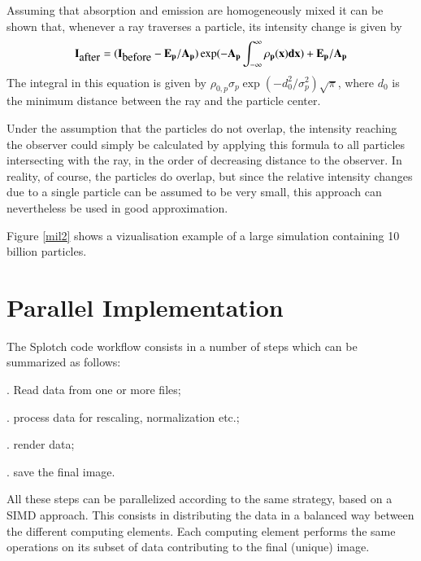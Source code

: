 Assuming that absorption and emission are homogeneously mixed it
can be shown that, whenever a ray traverses a particle, its intensity
change is given by
\begin{equation}
\label{i_change}
\bf{I}_{\mbox{after}}=(\bf{I}_{\mbox{before}}-\bf{E}_p/\bf{A}_p)\exp(-\bf{A}_p\int_{-\infty}^\infty\rho_p(x)dx) + \bf{E}_p/\bf{A}_p
\end{equation}
The integral in this equation is given by
$\rho_{0,p}\sigma_p\exp{(-d_0^2/\sigma_p^2)}\sqrt{\pi}$, where $d_0$
is the minimum distance between the ray and the particle center.

Under the assumption that the particles do not overlap, the intensity
reaching the observer could simply be calculated by applying this formula to
all particles intersecting with the ray, in the order of decreasing distance
to the observer. In reality, of course, the particles do overlap, but since
the relative intensity changes due to a single particle can be assumed to be
very small, this approach can nevertheless be used in good approximation.

Figure \ref{mil2} shows a vizualisation example of a large simulation 
containing 10 billion particles.

\section{Parallel Implementation}
\label{parallel}

The Splotch code workflow consists in a number of steps which can be summarized as follows:

. Read data from one or more files;

. process data for rescaling, normalization etc.;

. render data;

. save the final image.

All these steps can be parallelized according to the same strategy, based on a SIMD approach. 
This consists in 
distributing the data in a balanced way between the different computing elements.
Each computing element performs the same operations on its subset of data contributing 
to the final (unique) image. 

